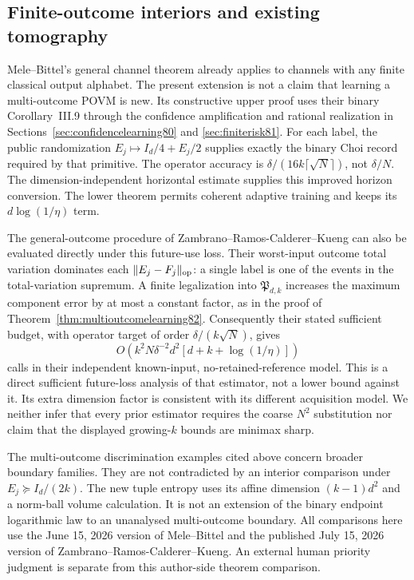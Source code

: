 \subsection{Finite-outcome interiors and existing tomography}
Mele--Bittel's general channel theorem \cite[Theorem~III.3]{MB67}
already applies to channels with any finite classical output alphabet.
The present extension is not a claim that learning a multi-outcome
POVM is new.  Its constructive upper proof uses their binary
Corollary~III.9 through the confidence amplification and rational
realization in Sections~\ref{sec:confidencelearning80} and
\ref{sec:finiterisk81}.  For each label, the public randomization
$E_j\mapsto I_d/4+E_j/2$ supplies exactly the binary Choi record
required by that primitive.  The operator accuracy is
$\delta/(16k\lceil\sqrt N\rceil)$, not $\delta/N$.
The dimension-independent horizontal estimate supplies this improved
horizon conversion.  The lower theorem permits coherent adaptive
training and keeps its $d\log(1/\eta)$ term.

The general-outcome procedure of
Zambrano--Ramos-Calderer--Kueng \cite[Theorem~2]{ZRK76}
can also be evaluated directly under this future-use loss.
Their worst-input outcome total variation dominates each
$\|E_j-F_j\|_{\rm op}$: a single label is one of the events in the
total-variation supremum.  A finite legalization into
$\mathfrak P_{d,k}$ increases the maximum component error by at most
a constant factor, as in the proof of
Theorem~\ref{thm:multioutcomelearning82}.
Consequently their stated sufficient budget, with operator target
of order $\delta/(k\sqrt N)$, gives
\[
 O\!\left(k^2N\delta^{-2}d^2
                   [d+k+\log(1/\eta)]\right)
\]
calls in their independent known-input, no-retained-reference model.
This is a direct sufficient future-loss analysis of that estimator,
not a lower bound against it.  Its extra dimension factor is
consistent with its different acquisition model.  We neither infer
that every prior estimator requires the coarse $N^2$ substitution
nor claim that the displayed growing-$k$ bounds are minimax sharp.

The multi-outcome discrimination examples cited above concern
broader boundary families.  They are not contradicted by an
interior comparison under $E_j\succeq I_d/(2k)$.
The new tuple entropy uses its affine dimension $(k-1)d^2$ and a
norm-ball volume calculation.  It is not an extension of the binary
endpoint logarithmic law to an unanalysed multi-outcome boundary.
All comparisons here use the June 15, 2026 version of Mele--Bittel
and the published July 15, 2026 version of
Zambrano--Ramos-Calderer--Kueng.  An external human priority judgment
is separate from this author-side theorem comparison.
